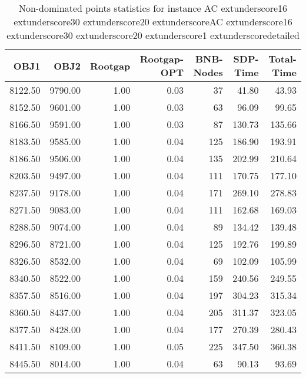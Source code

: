 \begin{table}
\caption{Non-dominated points statistics for instance AC	extunderscore16	extunderscore30	extunderscore20	extunderscoreAC	extunderscore16	extunderscore30	extunderscore20	extunderscore1	extunderscoredetailed}
\label{tab:stats/AC_16_30_20_AC_16_30_20_1_detailed}
\begin{tabular}{rrrrrrr}
\toprule
OBJ1 & OBJ2 & Rootgap & Rootgap-OPT & BNB-Nodes & SDP-Time & Total-Time \\
\midrule
8122.50 & 9790.00 & 1.00 & 0.03 & 37 & 41.80 & 43.93 \\
8152.50 & 9601.00 & 1.00 & 0.03 & 63 & 96.09 & 99.65 \\
8166.50 & 9591.00 & 1.00 & 0.03 & 87 & 130.73 & 135.66 \\
8183.50 & 9585.00 & 1.00 & 0.04 & 125 & 186.90 & 193.91 \\
8186.50 & 9506.00 & 1.00 & 0.04 & 135 & 202.99 & 210.64 \\
8203.50 & 9497.00 & 1.00 & 0.04 & 111 & 170.75 & 177.10 \\
8237.50 & 9178.00 & 1.00 & 0.04 & 171 & 269.10 & 278.83 \\
8271.50 & 9083.00 & 1.00 & 0.04 & 111 & 162.68 & 169.03 \\
8288.50 & 9074.00 & 1.00 & 0.04 & 89 & 134.42 & 139.48 \\
8296.50 & 8721.00 & 1.00 & 0.04 & 125 & 192.76 & 199.89 \\
8326.50 & 8532.00 & 1.00 & 0.04 & 69 & 102.09 & 105.99 \\
8340.50 & 8522.00 & 1.00 & 0.04 & 159 & 240.56 & 249.55 \\
8357.50 & 8516.00 & 1.00 & 0.04 & 197 & 304.23 & 315.34 \\
8360.50 & 8437.00 & 1.00 & 0.04 & 205 & 311.37 & 323.05 \\
8377.50 & 8428.00 & 1.00 & 0.04 & 177 & 270.39 & 280.43 \\
8411.50 & 8109.00 & 1.00 & 0.05 & 225 & 347.50 & 360.38 \\
8445.50 & 8014.00 & 1.00 & 0.04 & 63 & 90.13 & 93.69 \\
\bottomrule
\end{tabular}
\end{table}

